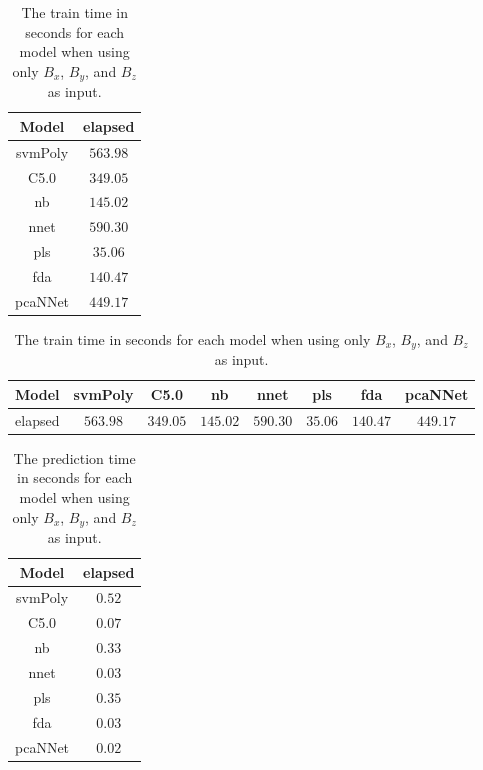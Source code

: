 \begin{table}[!ht]
	\centering
	\begin{tabular}{|c|c|}
		\hline
		Model & elapsed \\ \hline
		svmPoly & $563.98$ \\ \hline
		C5.0 & $349.05$ \\ \hline
		nb & $145.02$ \\ \hline
		nnet & $590.30$ \\ \hline
		pls & $35.06$ \\ \hline
		fda & $140.47$ \\ \hline
		pcaNNet & $449.17$ \\ \hline
	\end{tabular}
	\caption{The train time in seconds for each model when using only $B_{x}$, $B_{y}$, and $B_{z}$ as input.}
	\label{tab:time:coord:train}
\end{table}

\begin{table}[!ht]
	\centering
	\begin{tabular}{|c|c|c|c|c|c|c|c|}
		\hline
		Model & svmPoly & C5.0 & nb & nnet & pls & fda & pcaNNet \\ \hline
		elapsed & $563.98$ & $349.05$ & $145.02$ & $590.30$ & $35.06$ & $140.47$ & $449.17$ \\ \hline
	\end{tabular}
	\caption{The train time in seconds for each model when using only $B_{x}$, $B_{y}$, and $B_{z}$ as input.}
	\label{tab:time:reverse:coord:train}
\end{table}

\begin{table}[!ht]
	\centering
	\begin{tabular}{|c|c|}
		\hline
		Model & elapsed \\ \hline
		svmPoly & $0.52$ \\ \hline
		C5.0 & $0.07$ \\ \hline
		nb & $0.33$ \\ \hline
		nnet & $0.03$ \\ \hline
		pls & $0.35$ \\ \hline
		fda & $0.03$ \\ \hline
		pcaNNet & $0.02$ \\ \hline
	\end{tabular}
	\caption{The prediction time in seconds for each model when using only $B_{x}$, $B_{y}$, and $B_{z}$ as input.}
	\label{tab:time:coord:predict}
\end{table}

